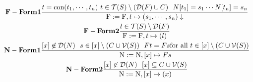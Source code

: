 \documentclass[14pt]{article}
\begin{document}
  \begin{gather*}\label{eA1}
   \bold{F-Form1} \frac
   { t = \textnormal{con}(t_1, \cdots,t_n) \ t \in \mathcal{T}(S) \setminus ( \mathcal{D}(F) \cup C)  \ \  N[t_1] = s_1 \cdots N[t_n] = s_n }
   { \textnormal{F} := \textnormal{F}, t \mapsto ( s_1, \cdots, s_n) \downarrow}\\
   \bold{F-Form2} \frac
   { l \in \mathcal{T}(S) \setminus \mathcal{D}(F)}
   { \textnormal{F} := \textnormal{F}, t \mapsto ( l)} \\
    \bold{N-Form1} \frac
    { [x] \not\in \mathcal{D}(N) \ \ s \in [x] \setminus ( C \cup \mathcal{V}(S)) \ \ F t= F s \textnormal{for all} \ t \in [x] \setminus ( C \cup \mathcal{V}(S)) }
    { \textnormal{N}:= \textnormal{N}, [x] \mapsto F s}\\
    \bold{N-Form2} \frac
    { [x] \not\in \mathcal{D}(N) \ \ [x] \subseteq  C \cup \mathcal{V}(S)} 
    { \textnormal{N}:= \textnormal{N}, [x] \mapsto (x)}
  \end{gather*}
\end{document}
